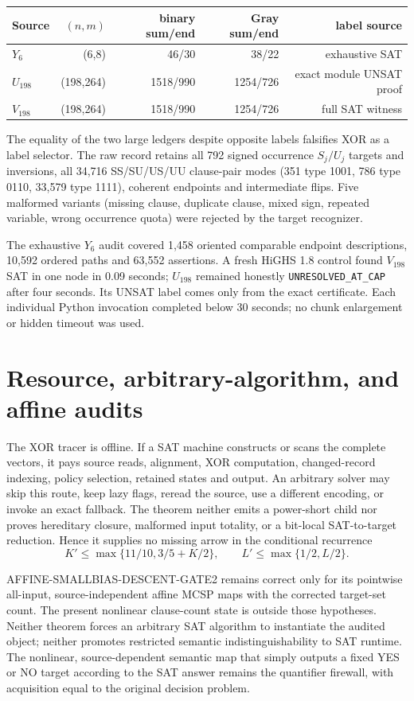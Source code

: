 \documentclass[11pt]{article}
\begin{document}
\begin{center}\begin{tabular}{lrrrr}
\toprule
Source & $(n,m)$ & binary sum/end & Gray sum/end & label source\\\midrule
$Y_6$&(6,8)&46/30&38/22&exhaustive SAT\\
$U_{198}$&(198,264)&1518/990&1254/726&exact module UNSAT proof\\
$V_{198}$&(198,264)&1518/990&1254/726&full SAT witness\\\bottomrule
\end{tabular}\end{center}

The equality of the two large ledgers despite opposite labels falsifies XOR as a label
selector.  The raw record retains all 792 signed occurrence $S_j/U_j$ targets and
inversions, all 34,716 SS/SU/US/UU clause-pair modes (351 type 1001, 786 type 0110,
33,579 type 1111), coherent endpoints and intermediate flips.  Five malformed variants
(missing clause, duplicate clause, mixed sign, repeated variable, wrong occurrence
quota) were rejected by the target recognizer.

The exhaustive $Y_6$ audit covered 1,458 oriented comparable endpoint descriptions,
10,592 ordered paths and 63,552 assertions.  A fresh HiGHS 1.8 control found $V_{198}$
SAT in one node in 0.09 seconds; $U_{198}$ remained honestly
\texttt{UNRESOLVED\_AT\_CAP} after four seconds.  Its UNSAT label comes only from the
exact certificate.  Each individual Python invocation completed below 30 seconds; no
chunk enlargement or hidden timeout was used.

\section{Resource, arbitrary-algorithm, and affine audits}
The XOR tracer is offline.  If a SAT machine constructs or scans the complete vectors,
it pays source reads, alignment, XOR computation, changed-record indexing, policy
selection, retained states and output.  An arbitrary solver may skip this route, keep
lazy flags, reread the source, use a different encoding, or invoke an exact fallback.
The theorem neither emits a power-short child nor proves hereditary closure, malformed
input totality, or a bit-local SAT-to-target reduction.  Hence it supplies no missing
arrow in the conditional recurrence
\[
 K'\le\max\{11/10,3/5+K/2\},\qquad
 L'\le\max\{1/2,L/2\}.
\]

AFFINE-SMALLBIAS-DESCENT-GATE2 remains correct only for its pointwise all-input,
source-independent affine MCSP maps with the corrected target-set count.  The present
nonlinear clause-count state is outside those hypotheses.  Neither theorem forces an
arbitrary SAT algorithm to instantiate the audited object; neither promotes restricted
semantic indistinguishability to SAT runtime.  The nonlinear, source-dependent semantic
map that simply outputs a fixed YES or NO target according to the SAT answer remains the
quantifier firewall, with acquisition equal to the original decision problem.
\end{document}
